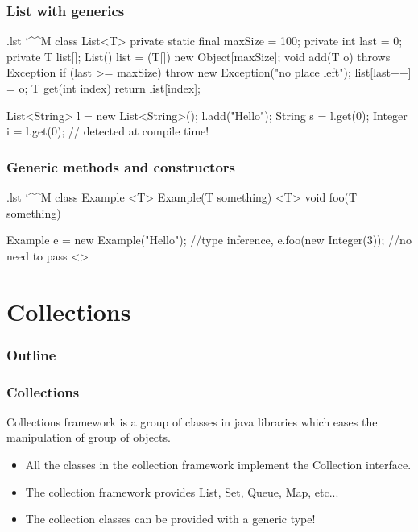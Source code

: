 \documentclass[10pt]{beamer}
\makeatletter
\newenvironment{code}{%
  \begingroup
  \@bsphack
  \immediate\openout\lstvrb@out\jobname.lst
  \let\do\@makeother\dospecials\catcode`\^^M\active
  \def\verbatim@processline{%
    \immediate\write\lstvrb@out{\the\verbatim@line}}%
  \verbatim@start}{%
  \immediate\closeout\lstvrb@out
  \@esphack
  \endgroup

  \begin{alertblock}{}
    
  \end{alertblock}}
\makeatother
\begin{document}
\begin{frame}
\frametitle{List with generics}
\begin{code}
  class List<T> {
    private static final maxSize = 100;
    private int last = 0;
    private T list[];
    List() {
      list = (T[]) new Object[maxSize];
    }
    void add(T o) throws Exception{
      if (last >= maxSize)
        throw new Exception("no place left");
      list[last++] = o;
    }
    T get(int index) {
      return list[index];
    }
  }

  List<String> l = new List<String>();
  l.add("Hello");
  String s = l.get(0);
  Integer i = l.get(0); // detected at compile time!
\end{code}
\end{frame}

\begin{frame}
\frametitle{Generic methods and constructors}
\begin{code}
class Example {
  <T> Example(T something) {}
  <T> void foo(T something) {}
}

  Example e = new Example("Hello"); //type inference,
  e.foo(new Integer(3));            //no need to pass <>
\end{code}
\end{frame}

\section{Collections}
\begin{frame}
  \frametitle{Outline}
  \tableofcontents
\end{frame}

\begin{frame}
  \frametitle{Collections}
\begin{definition}
  Collections framework is a group of classes in java libraries which eases the manipulation of
  group of objects.
\end{definition}
\begin{itemize}
  \item All the classes in the collection framework implement the Collection interface.
  \item The collection framework provides List, Set, Queue, Map, etc...
  \item The collection classes can be provided with a generic type!
\end{itemize}
\end{frame}
\end{document}
